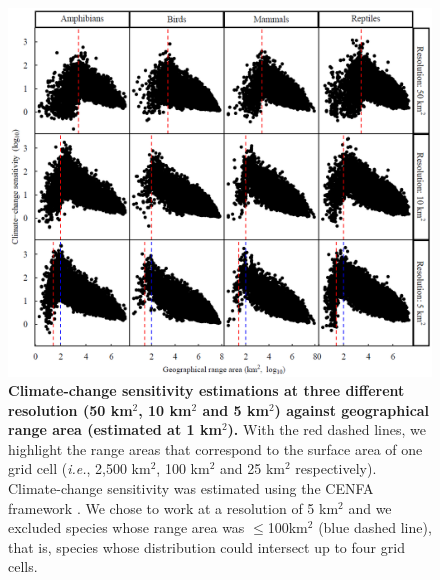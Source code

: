 \documentclass[11pt]{article}
\begin{document}

\begin{figure}[h!]
\centering
\includegraphics[scale=0.8]{Figures/CENFA_allres}
\caption[]{\textbf{Climate-change sensitivity estimations at three different resolution (50 km$^2$, 10 km$^2$ and 5 km$^2$) against geographical range area (estimated at 1 km$^2$).} With the red dashed lines, we highlight the range areas that correspond to the surface area of one grid cell (\textit{i.e.}, 2,500 km$^2$, 100 km$^2$ and 25 km$^2$ respectively). Climate-change sensitivity was estimated using the CENFA framework \citep{Rinnan2019}. We chose to work at a resolution of 5 km$^2$ and we excluded species whose range area was $\leq$100km$^2$ (blue dashed line), that is, species whose distribution could intersect up to four grid cells.}
\label{CENFAres}
\end{figure}
\end{document}
